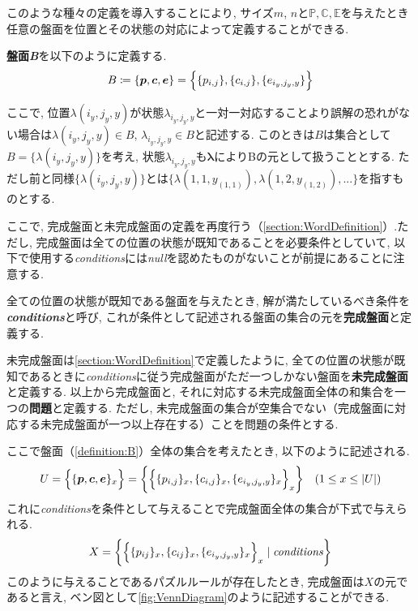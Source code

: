 このような種々の定義を導入することにより, サイズ$m$, $n$と$\mathbb{P},\mathbb{C},\mathbb{E}$を与えたとき任意の盤面を位置とその状態の対応によって定義することができる.
\begin{definition}[盤面\textit{B}]\label{definition:B}
  \textbf{盤面\textit{B}}を以下のように定義する.
  \begin{equation*}
    B\coloneqq \{\bm{p},\bm{c},\bm{e}\}=\Bigl\{\{p_{i,j}\},\{c_{i,j}\},\{e_{i_y,j_y,y}\}\Bigr\}
  \end{equation*}
\end{definition}
ここで, 位置$\lambda(i_y,j_y,y)$が状態$\lambda_{i_y,j_y,y}$と一対一対応することより誤解の恐れがない場合は$\lambda(i_y,j_y,y) \in B  $, $\lambda_{i_y,j_y,y}\in B $と記述する.
このときは$B$は集合として$B=\{\lambda(i_y,j_y,y)\}$を考え, 状態$\lambda_{i_y,j_y,y}$も$\bm{\lambda}$によりBの元として扱うこととする.
ただし前と同様$\{\lambda(i_y,j_y,y)\}$とは$\{\lambda(1,1,y_{(1,1)}), \lambda(1,2,y_{(1,2)}),...\}$を指すものとする.



ここで, 完成盤面と未完成盤面の定義を再度行う（\cref{section:WordDefinition}）.ただし, 完成盤面は全ての位置の状態が既知であることを必要条件としていて, 以下で使用する\textit{conditions}には\textit{null}を認めたものがないことが前提にあることに注意する.
\begin{definition}\label{definition:Conditions}
  全ての位置の状態が既知である盤面を与えたとき, 解が満たしているべき条件を\textbf{\textit{conditions}}と呼び, これが条件として記述される盤面の集合の元を\textbf{完成盤面}と定義する.
\end{definition}

未完成盤面は\cref{section:WordDefinition}で定義したように, 全ての位置の状態が既知であるときに\textit{conditions}に従う完成盤面がただ一つしかない盤面を\textbf{未完成盤面}と定義する.
以上から完成盤面と, それに対応する未完成盤面全体の和集合を一つの\textbf{問題}と定義する. ただし, 未完成盤面の集合が空集合でない（完成盤面に対応する未完成盤面が一つ以上存在する）ことを問題の条件とする.

ここで盤面（\cref{definition:B}）全体の集合を考えたとき, 以下のように記述される.
\begin{equation}\label{equation:U}
  U=\Bigl\{\{\bm{p},\bm{c},\bm{e}\}_x\Bigr\}=\biggl\{\Bigl\{\{p_{i,j}\}_x,\{c_{i,j}\}_x,\{e_{i_y,j_y,y}\}_x\Bigr\}_x\biggr\} \quad (1\leq x \leq |U|)
\end{equation}
これに\textit{conditions}を条件として与えることで完成盤面全体の集合が下式で与えられる.
\begin{equation}\label{equation:X}
  X=\biggl\{\Bigl\{\{p_{ij}\}_x,\{c_{ij}\}_x,\{e_{i_y,j_y,y}\}_x\Bigr\}_x\mid \rm{\textit{conditions}}\biggr\}
\end{equation}
このように与えることであるパズルルールが存在したとき, 完成盤面は$X$の元であると言え, ベン図として\cref{fig:VennDiagram}のように記述することができる.

